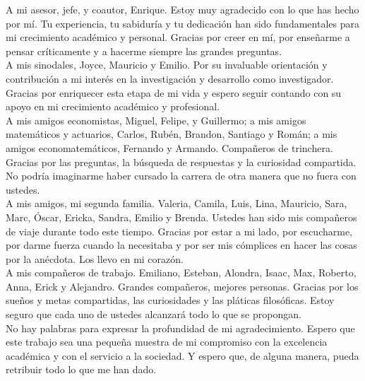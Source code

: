 \documentclass[10pt, oneside]{book}
\begin{document}
\noindent A mi asesor, jefe, y coautor, Enrique. Estoy muy agradecido con lo que has hecho por mí. Tu experiencia, tu sabiduría y tu dedicación han sido fundamentales para mi crecimiento académico y personal. Gracias por creer en mí, por enseñarme a pensar críticamente y a hacerme siempre las grandes preguntas. \\

\noindent A mis sinodales, Joyce, Mauricio y Emilio. Por su invaluable orientación y contribución a mi interés en la investigación y desarrollo como investigador. Gracias por enriquecer esta etapa de mi vida y espero seguir contando con su apoyo en mi crecimiento académico y profesional. \\

\noindent A mis amigos economistas, Miguel, Felipe, y Guillermo; a mis amigos matemáticos y actuarios, Carlos, Rubén, Brandon, Santiago y Román; a mis amigos economatemáticos, Fernando y Armando.  Compañeros de trinchera. Gracias por las preguntas, la búsqueda de respuestas y la curiosidad compartida. No podría imaginarme haber cursado la carrera de otra manera que no fuera con ustedes. \\

\noindent A mis amigos, mi segunda familia. Valeria, Camila, Luis, Lina, Mauricio, Sara, Marc, Óscar, Ericka, Sandra, Emilio y Brenda. Ustedes han sido mis compañeros de viaje durante todo este tiempo. Gracias por estar a mi lado, por escucharme, por darme fuerza cuando la necesitaba y por ser mis cómplices en hacer las cosas por la anécdota. Los llevo en mi corazón. \\

\noindent A mis compañeros de trabajo. Emiliano, Esteban, Alondra, Isaac, Max, Roberto, Anna, Erick y Alejandro. Grandes compañeros, mejores personas. Gracias por los sueños y metas compartidas, las curiosidades y las pláticas filosóficas. Estoy seguro que cada uno de ustedes alcanzará todo lo que se propongan. \\

\noindent No hay palabras para expresar la profundidad de mi agradecimiento. Espero que este trabajo sea una pequeña muestra de mi compromiso con la excelencia académica y con el servicio a la sociedad. Y espero que, de alguna manera, pueda retribuir todo lo que me han dado.

\end{document}
